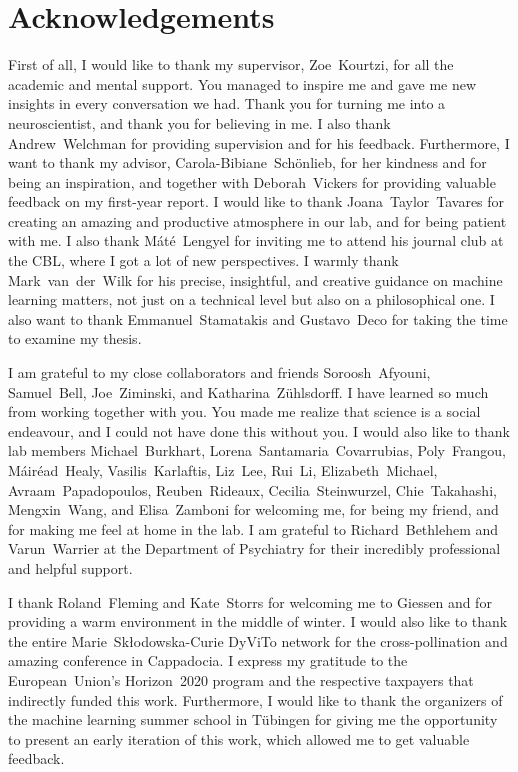 \chapter*{Acknowledgements}

First of all, I would like to thank my supervisor, Zoe~Kourtzi, for all the academic and mental support.
You managed to inspire me and gave me new insights in every conversation we had.
Thank you for turning me into a neuroscientist, and thank you for believing in me.
I also thank Andrew~Welchman for providing supervision and for his feedback.
Furthermore, I want to thank my advisor, Carola-Bibiane~Schönlieb, for her kindness and for being an inspiration, and together with Deborah~Vickers for providing valuable feedback on my first-year report.
I would like to thank Joana~Taylor~Tavares for creating an amazing and productive atmosphere in our lab, and for being patient with me.
I also thank Máté~Lengyel for inviting me to attend his journal club at the CBL, where I got a lot of new perspectives.
I warmly thank Mark~van~der~Wilk for his precise, insightful, and creative guidance on machine learning matters, not just on a technical level but also on a philosophical one.
I also want to thank Emmanuel~Stamatakis and Gustavo~Deco for taking the time to examine my thesis.

I am grateful to my close collaborators and friends Soroosh~Afyouni, Samuel~Bell, Joe~Ziminski, and Katharina~Zühlsdorff.
I have learned so much from working together with you.
You made me realize that science is a social endeavour, and I could not have done this without you.
I would also like to thank lab members Michael~Burkhart, Lorena~Santamaria~Covarrubias, Poly~Frangou, Máiréad~Healy, Vasilis~Karlaftis, Liz~Lee, Rui~Li, Elizabeth~Michael, Avraam~Papadopoulos, Reuben~Rideaux, Cecilia~Steinwurzel, Chie~Takahashi, Mengxin~Wang, and Elisa~Zamboni for welcoming me, for being my friend, and for making me feel at home in the lab.
I am grateful to Richard~Bethlehem and Varun~Warrier at the Department of Psychiatry for their incredibly professional and helpful support.

I thank Roland~Fleming and Kate~Storrs for welcoming me to Giessen and for providing a warm environment in the middle of winter.
I would also like to thank the entire Marie~Sk\l{}odowska-Curie DyViTo network for the cross-pollination and amazing conference in Cappadocia.
I express my gratitude to the European~Union's Horizon~2020 program and the respective taxpayers that indirectly funded this work.
Furthermore, I would like to thank the organizers of the machine learning summer school in T\"{u}bingen for giving me the opportunity to present an early iteration of this work, which allowed me to get valuable feedback.

